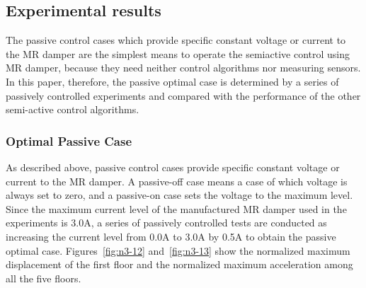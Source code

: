 
\subsection{Experimental results}
The passive control cases which provide specific constant voltage or current to the MR damper are the simplest means to operate the semiactive control using MR damper, because they need neither control algorithms nor measuring sensors. In this paper, therefore, the passive optimal case is determined by a series of passively controlled experiments and compared with the performance of the other semi-active control algorithms.

\subsubsection{Optimal Passive Case}
As described above, passive control cases provide specific constant voltage or current to the MR damper. A passive-off case means a case of which voltage is always set to zero, and a passive-on case sets the voltage to the maximum level. Since the maximum current level of the manufactured MR damper used in the experiments is 3.0A, a series of passively controlled tests are conducted as increasing the current level from 0.0A to 3.0A by 0.5A to obtain the passive optimal case. Figures~\ref{fig:n3-12} and~\ref{fig:n3-13} show the normalized maximum displacement of the first floor and the normalized maximum acceleration among all the five floors. 

